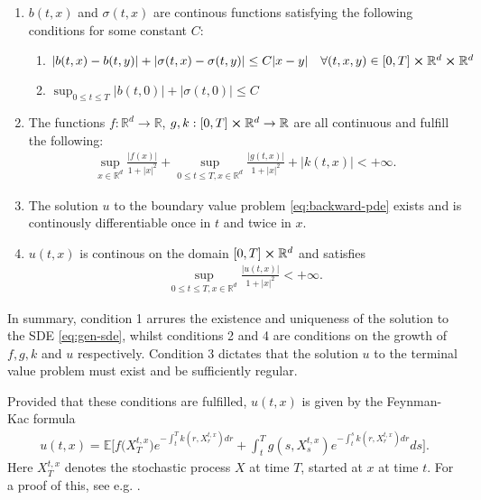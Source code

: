 \begin{enumerate}
    \item $b(t,x)$ and $\sigma(t,x)$ are continous functions satisfying the following conditions for some constant $C$: \begin{enumerate}
        \item $\lvert b(t,x) - b(t,y) \rvert + \lvert \sigma(t,x) - \sigma(t,y) \rvert \leq C \lvert x - y \rvert \quad \forall (t,x,y) \in [0,T]\cross \mathbb{R}^d \cross \mathbb{R}^d$
        \item $ \sup_{0\leq t \leq T} \lvert b(t,0) \rvert + \lvert \sigma(t,0) \rvert \leq C$
    \end{enumerate}
    \item The functions $f:\mathbb{R}^d \rightarrow \mathbb{R}$, $g,k : [0,T]\cross \mathbb{R}^d \rightarrow \mathbb{R}$ are all continuous and fulfill the following:
    \begin{align} 
        \sup_{x \in \mathbb{R}^d} \frac{\lvert f(x) \rvert}{1 + {\lvert x \rvert} ^2} + \sup_{0 \leq t \leq T, x \in \mathbb{R}^d} \frac{\lvert g(t,x) \rvert}{1 + {\lvert x \rvert}^2} + \lvert k(t,x) \rvert < + \infty.
    \end{align}
    \item The solution $u$ to the boundary value problem \autoref{eq:backward-pde} exists and is continously differentiable once in $t$ and twice in $x$.
    \item $u(t,x)$ is continous on the domain $[0,T]\cross\mathbb{R}^d$ and satisfies 
    \begin{align} 
        \sup_{0\leq t \leq T, x \in \mathbb{R}^d} \frac{\lvert u(t,x) \rvert}{1 + {\lvert x \rvert}^2} < + \infty.
    \end{align}
\end{enumerate}
In summary, condition 1 arrures the existence and uniqueness of the solution to the SDE \autoref{eq:gen-sde}, whilst conditions 2 and 4 are conditions on the growth of $f,g,k$ and $u$ respectively. Condition 3 dictates that the solution $u$ to the terminal value problem must exist and be sufficiently regular.

Provided that these conditions are fulfilled, $u(t,x)$ is given by the Feynman-Kac formula
%
\begin{align}
    \label{eq:linear-fc} 
    u(t,x) = \mathbb{E}\bigg[ f\big( X_T^{t,x} \big) e^{-\int_t^T k(r,X_r^{t,x})dr} + \int_t^T g(s,X_s^{t,x}) e^{-\int_t^s k(r,X_r^{t,x})dr}ds\bigg].
\end{align} 
%
Here $X_T^{t,x}$ denotes the stochastic process $X$ at time $T$, started at $x$ at time $t$. For a proof of this, see e.g. \cite{gobet2016monte}.

